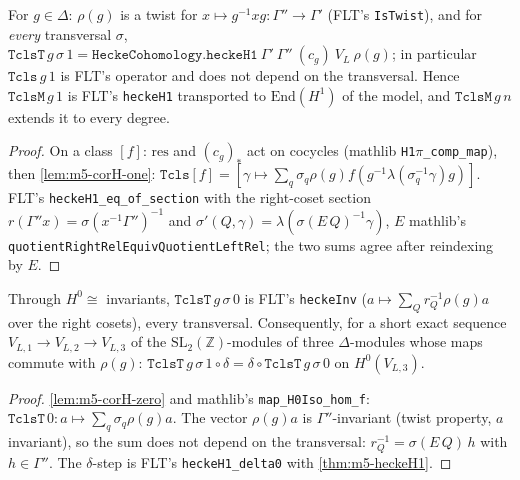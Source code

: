 \begin{theorem}\label{thm:m5-heckeH1}
  \leanok
  For $g\in\Delta$: $\rho(g)$ is a twist for $x\mapsto g^{-1}xg\colon\Gamma''\to\Gamma'$ (FLT's \texttt{IsTwist}), and for
  \emph{every} transversal $\sigma$, $\texttt{TclsT}\,g\,\sigma\,1=\texttt{HeckeCohomology.heckeH1}\ \Gamma'\ \Gamma''\ (c_g)\ V_L\ \rho(g)$;
  in particular $\texttt{Tcls}\,g\,1$ is FLT's operator and does not depend on the transversal. Hence $\texttt{TclsM}\,g\,1$ is FLT's
  \texttt{heckeH1} transported to $\mathrm{End}(H^1)$ of the model, and $\texttt{TclsM}\,g\,n$ extends it to every degree.
\end{theorem}
\begin{proof}
  \leanok
  On a class $[f]$: $\mathrm{res}$ and $(c_g)_*$ act on cocycles (mathlib \texttt{H1}$\pi$\texttt{\_comp\_map}), then \ref{lem:m5-corH-one}:
  $\texttt{Tcls}[f]=[\gamma\mapsto\sum_q\sigma_q\rho(g)f(g^{-1}\lambda(\sigma_q^{-1}\gamma)g)]$. FLT's
  \texttt{heckeH1\_eq\_of\_section} with the right-coset section $r(\Gamma''x)=\sigma(x^{-1}\Gamma'')^{-1}$ and
  $\sigma'(Q,\gamma)=\lambda(\sigma(E\,Q)^{-1}\gamma)$, $E$ mathlib's \texttt{quotientRightRelEquivQuotientLeftRel}; the two sums
  agree after reindexing by $E$.
\end{proof}

\begin{theorem}\label{thm:m5-delta0}
  \leanok
  Through $H^0\cong$ invariants, $\texttt{TclsT}\,g\,\sigma\,0$ is FLT's \texttt{heckeInv}
  ($a\mapsto\sum_Q r_Q^{-1}\rho(g)a$ over the right cosets), every transversal. Consequently, for a short exact sequence
  $V_{L,1}\to V_{L,2}\to V_{L,3}$ of the $\mathrm{SL}_2(\mathbb Z)$-modules of three $\Delta$-modules whose maps commute with
  $\rho(g)$: $\texttt{TclsT}\,g\,\sigma\,1\circ\delta=\delta\circ\texttt{TclsT}\,g\,\sigma\,0$ on $H^0(V_{L,3})$.
\end{theorem}
\begin{proof}
  \leanok
  \ref{lem:m5-corH-zero} and mathlib's \texttt{map\_H0Iso\_hom\_f}: $\texttt{TclsT}\,0\colon a\mapsto\sum_q\sigma_q\rho(g)a$. The vector
  $\rho(g)a$ is $\Gamma''$-invariant (twist property, $a$ invariant), so the sum does not depend on the transversal: $r_Q^{-1}=
  \sigma(E\,Q)\,h$ with $h\in\Gamma''$. The $\delta$-step is FLT's \texttt{heckeH1\_delta0} with \ref{thm:m5-heckeH1}.
\end{proof}

